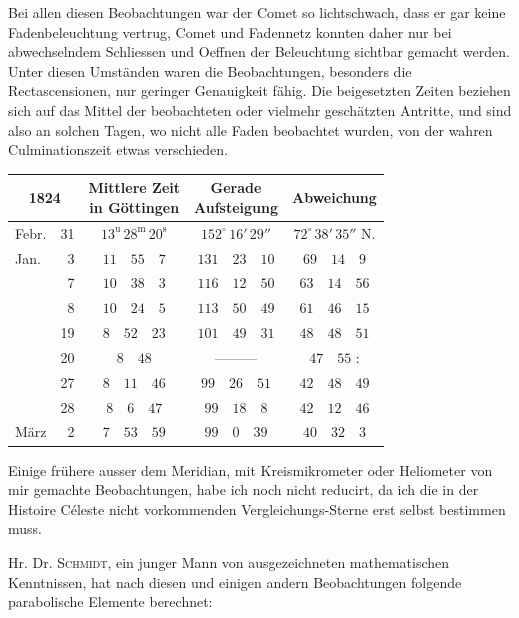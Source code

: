 Bei allen diesen Beobachtungen war der Comet so lichtschwach, dass er gar keine
Fadenbeleuchtung vertrug, Comet und Fadennetz konnten daher nur bei
abwechselndem Schliessen und Oeffnen der Beleuchtung sichtbar gemacht werden.
Unter diesen Umständen waren die Beobachtungen, besonders die Rectascensionen,
nur geringer Genauigkeit fähig. Die beigesetzten Zeiten beziehen sich auf das
Mittel der beobachteten oder vielmehr geschätzten Antritte, und sind also an
solchen Tagen, wo nicht alle Faden beobachtet wurden, von der wahren
Culminationszeit etwas verschieden.

\begin{center}
\begingroup\small\setlength{\tabcolsep}{4pt}
\begin{tabular}{lr|c|c|c}
\multicolumn{2}{c|}{1824} & \shortstack{Mittlere Zeit\\in Göttingen} & \shortstack{Gerade\\Aufsteigung} & Abweichung \\
\hline
Febr. & 31 & $13^{\mathrm u}\,28^{\mathrm m}\,20^{\mathrm s}$ & $152^\circ\,16'\,29''$ & $72^\circ\,38'\,35''$ N. \\
Jan. & 3 & $11\quad55\quad7$ & $131\quad23\quad10$ & $69\quad14\quad9$ \\
 & 7 & $10\quad38\quad3$ & $116\quad12\quad50$ & $63\quad14\quad56$ \\
 & 8 & $10\quad24\quad5$ & $113\quad50\quad49$ & $61\quad46\quad15$ \\
 & 19 & $8\quad52\quad23$ & $101\quad49\quad31$ & $48\quad48\quad51$ \\
 & 20 & $8\quad48$ & ---\quad---\quad--- & $47\quad55$ \quad : \\
 & 27 & $8\quad11\quad46$ & $99\quad26\quad51$ & $42\quad48\quad49$ \\
 & 28 & $8\quad6\quad47$ & $99\quad18\quad8$ & $42\quad12\quad46$ \\
März & 2 & $7\quad53\quad59$ & $99\quad0\quad39$ & $40\quad32\quad3$ \\
\end{tabular}
\endgroup
\end{center}

Einige frühere ausser dem Meridian, mit Kreismikrometer oder Heliometer von mir
gemachte Beobachtungen, habe ich noch nicht reducirt, da ich die in der
Histoire Céleste nicht vorkommenden Vergleichungs-Sterne erst selbst bestimmen
muss.

Hr. Dr. \textsc{Schmidt}, ein junger Mann von ausgezeichneten mathematischen
Kenntnissen, hat nach diesen und einigen andern Beobachtungen folgende
parabolische Elemente berechnet:

